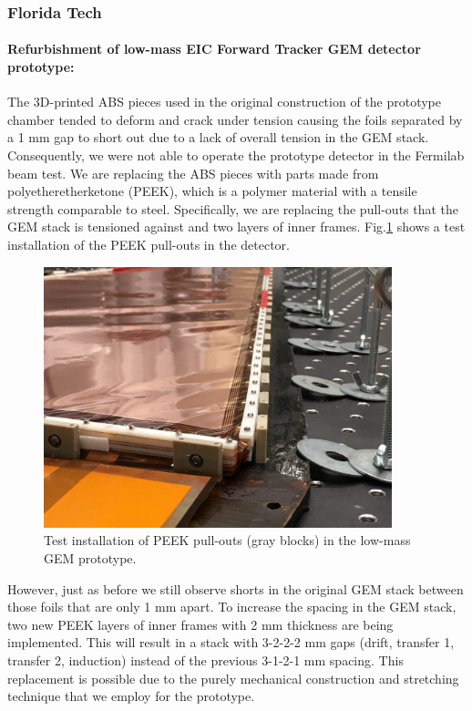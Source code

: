 \subsubsection{Florida Tech} 

\paragraph*{Refurbishment of low-mass EIC Forward Tracker GEM detector prototype:}

The 3D-printed ABS pieces used in the original construction of the prototype chamber tended to deform and crack under tension causing the foils separated by a 1 mm gap to short out due to a lack of overall tension in the GEM stack. Consequently, we were not able to operate the prototype detector in the Fermilab beam test. We are replacing the ABS pieces with parts made from polyetheretherketone (PEEK), which is a polymer material with a tensile strength comparable to steel. Specifically, we are replacing the pull-outs that the GEM stack is tensioned against and two layers of inner frames. Fig.\ref{fig:installation} shows a test installation of the PEEK pull-outs in the detector.

\begin{figure}[h]
	\centering
	\includegraphics[width=0.9\textwidth]{FIT_plots/PEEK_Installation.jpg} 
	\caption{Test installation of PEEK pull-outs (gray blocks) in the low-mass GEM prototype.}
	\label{fig:installation}
\end{figure}

However, just as before we still observe shorts in the original GEM stack between those foils that are only 1 mm apart. To increase the spacing in the GEM stack, two new PEEK layers of inner frames with 2 mm thickness are being implemented. This will result in a stack with 3-2-2-2 mm gaps (drift, transfer 1, transfer 2, induction) instead of the previous 3-1-2-1 mm spacing. This replacement is possible due to the purely mechanical construction and stretching technique that we employ for the prototype.

